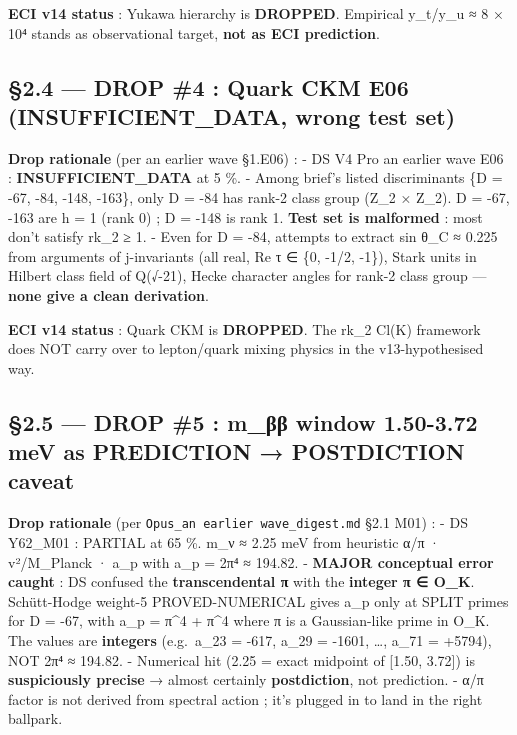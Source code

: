 \documentclass[
  11pt,
  a4paper,
]{article}
\begin{document}
\textbf{ECI v14 status} : Yukawa hierarchy is \textbf{DROPPED}. Empirical y\_t/y\_u ≈ 8 × 10⁴ stands as observational target, \textbf{not as ECI prediction}.

\hypertarget{drop-4-quark-ckm-e06-insufficient_data-wrong-test-set}{%
\subsection{§2.4 --- DROP \#4 : Quark CKM E06 (INSUFFICIENT\_DATA, wrong test set)}\label{drop-4-quark-ckm-e06-insufficient_data-wrong-test-set}}

\textbf{Drop rationale} (per an earlier wave §1.E06) :
- DS V4 Pro an earlier wave E06 : \textbf{INSUFFICIENT\_DATA} at 5 \%.
- Among brief's listed discriminants \{D = -67, -84, -148, -163\}, only D = -84 has rank-2 class group (Z\_2 × Z\_2). D = -67, -163 are h = 1 (rank 0) ; D = -148 is rank 1. \textbf{Test set is malformed} : most don't satisfy rk\_2 ≥ 1.
- Even for D = -84, attempts to extract sin θ\_C ≈ 0.225 from arguments of j-invariants (all real, Re τ ∈ \{0, -1/2, -1\}), Stark units in Hilbert class field of Q(√-21), Hecke character angles for rank-2 class group --- \textbf{none give a clean derivation}.

\textbf{ECI v14 status} : Quark CKM is \textbf{DROPPED}. The rk\_2 Cl(K) framework does NOT carry over to lepton/quark mixing physics in the v13-hypothesised way.

\hypertarget{drop-5-m_ux3b2ux3b2-window-1.50-3.72-mev-as-prediction-postdiction-caveat}{%
\subsection{§2.5 --- DROP \#5 : m\_ββ window 1.50-3.72 meV as PREDICTION → POSTDICTION caveat}\label{drop-5-m_ux3b2ux3b2-window-1.50-3.72-mev-as-prediction-postdiction-caveat}}

\textbf{Drop rationale} (per \texttt{Opus\_an earlier wave\_digest.md} §2.1 M01) :
- DS Y62\_M01 : PARTIAL at 65 \%. m\_ν ≈ 2.25 meV from heuristic α/π · v²/M\_Planck · a\_p with a\_p = 2π⁴ ≈ 194.82.
- \textbf{MAJOR conceptual error caught} : DS confused the \textbf{transcendental π} with the \textbf{integer π ∈ O\_K}. Schütt-Hodge weight-5 PROVED-NUMERICAL gives a\_p only at SPLIT primes for D = -67, with a\_p = π\^{}4 + π\^{}4 where π is a Gaussian-like prime in O\_K. The values are \textbf{integers} (e.g.~a\_23 = -617, a\_29 = -1601, \ldots, a\_71 = +5794), NOT 2π⁴ ≈ 194.82.
- Numerical hit (2.25 = exact midpoint of {[}1.50, 3.72{]}) is \textbf{suspiciously precise} → almost certainly \textbf{postdiction}, not prediction.
- α/π factor is not derived from spectral action ; it's plugged in to land in the right ballpark.
\end{document}

